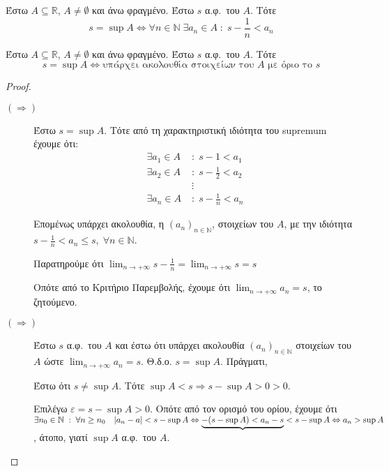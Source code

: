 \documentclass[main.tex]{subfiles}
\begin{document}
\begin{mypropbox}
Έστω $ A \subseteq \mathbb{R} $, $ A \neq \emptyset $ και άνω φραγμένο. 
  Έστω $ s $ α.φ.\ του $A$. Τότε 
  \[
    s = \sup A \Leftrightarrow \forall n \in \mathbb{N} \; \exists a_{n} \in A
    \; : \; s - \frac{1}{n} < a_{n} 
\]
\end{mypropbox}

\begin{mythmbox}
Έστω $ A \subseteq \mathbb{R} $, $ A \neq \emptyset $ και άνω φραγμένο. 
  Έστω $ s $ α.φ.\ του $A$. Τότε 
  \[
    s = \sup A \Leftrightarrow \text{υπάρχει ακολουθία στοιχείων του $A$ με όριο το $s$} 
\]
\end{mythmbox}
\begin{proof}
\item {}
  \begin{description}
    \item [$ (\Rightarrow) $]
      Έστω $ s = \sup A $. Τότε από τη χαρακτηριστική ιδιότητα του supremum έχουμε ότι:
      \begin{align*}
        \exists a_{1} \in A \; &: \; s - 1 < a_{1} \\
        \exists a_{2} \in A \; &: \; s - \frac{1}{2}  < a_{2} \\
                               &\vdots \\
        \exists a_{n} \in A \; &: \; s - \frac{1}{n}  < a_{n} 
      \end{align*} 

      Επομένως υπάρχει ακολουθία, η $ (a_{n})_{n \in \mathbb{N}} $, στοιχείων του $A$, 
      με την ιδιότητα $ s - \frac{1}{n} < a_{n} \leq s, \; \forall n \in \mathbb{N}$. 

      Παρατηρούμε ότι $ \lim_{n \to +\infty} s- \frac{1}{n} = \lim_{n \to +\infty} s = s $ 

      Οπότε από το Κριτήριο Παρεμβολής, έχουμε ότι $ \lim_{n \to +\infty} a_{n}= s $, 
      το ζητούμενο.

    \item [$ (\Rightarrow) $]
      Έστω $ s $ α.φ.\ του $A$ και έστω ότι υπάρχει ακολουθία $ (a_{n})_{n \in \mathbb{N}} $ 
      στοιχείων του $A$ ώστε $ \lim_{n \to +\infty} a_{n}= s$. Θ.δ.ο. $ s = \sup A $. 
      Πράγματι, 

      Έστω ότι $ s \neq \sup A $. Τότε $ \sup A < s \Rightarrow s - \sup A > 0 > 0 $. 

      Επιλέγω $ \varepsilon = s - \sup A >0 $. Οπότε από τον ορισμό του ορίου, έχουμε ότι 
      $ \exists n_{0} \in \mathbb{N} \; : \; \forall n \geq n_{0} \quad \abs{a_{n} - a} < 
      s - \sup A \Leftrightarrow \underbrace{-(s - \sup A) < a_{n} - s} < s - \sup A 
      \Leftrightarrow a_{n} > \sup A$, άτοπο, γιατί $ \sup A $ α.φ.\ του $A$.
  \end{description}
\end{proof}
\end{document}
